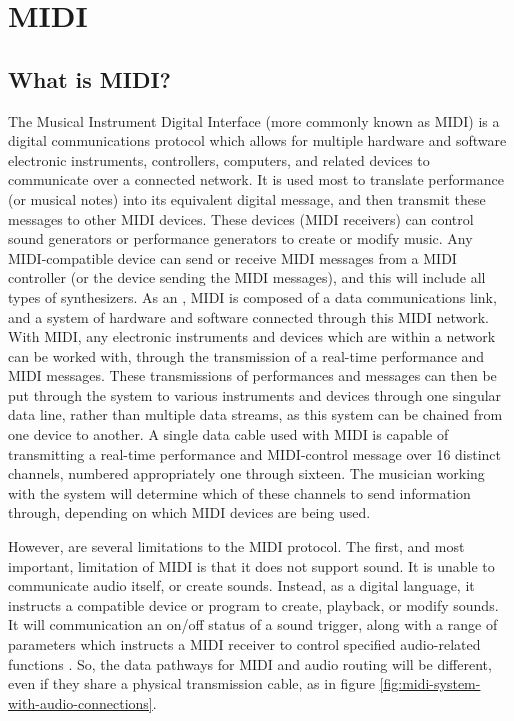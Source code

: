 \section[MIDI: An Introduction]{MIDI}\label{section:midi}

\subsection[What is MIDI?]{What is MIDI?}\label{section:what-midi}
The Musical Instrument Digital Interface (more commonly known as MIDI) is a digital communications protocol which allows for multiple hardware and software electronic instruments, controllers, computers, and related devices to communicate over a connected network\cite{Huber_2012}. It is used most to translate performance  (or musical notes) into its equivalent digital message, and then transmit these messages to other MIDI devices. These devices (MIDI receivers) can control sound generators or performance generators to create or modify music. Any MIDI-compatible device can send or receive MIDI messages from a MIDI controller (or the device sending the MIDI messages), and this will include all types of synthesizers. As an , MIDI is composed of a data communications link, and a system of hardware and software connected through this MIDI network. With MIDI, any electronic instruments and devices which are within a network can be worked with, through the transmission of a real-time performance and MIDI messages. These transmissions of performances and messages can then be put through the system to various instruments and devices through one singular data line, rather than multiple data streams, as this system can be chained from one device to another. A single data cable used with MIDI is capable of transmitting a real-time performance and MIDI-control message over 16 distinct channels, numbered appropriately one through sixteen. The musician working with the system will determine which of these channels to send information through, depending on which MIDI devices are being used\cite{Romano_2003}.

However, are several limitations to the MIDI protocol. The first, and most important, limitation of MIDI is that it does not support sound. It is unable to communicate audio itself, or create sounds\cite{Huber_2012}. Instead, as a digital language, it instructs a compatible device or program to create, playback, or modify sounds. It will communication an on/off status of a sound trigger, along with a range of parameters which instructs a MIDI receiver to control specified audio-related functions \cite{Kirk_Hunt_2013}. So, the data pathways for MIDI and audio routing will be different, even if they share a physical transmission cable, as in figure \ref{fig:midi-system-with-audio-connections}\cite{Huber_2012}. 

